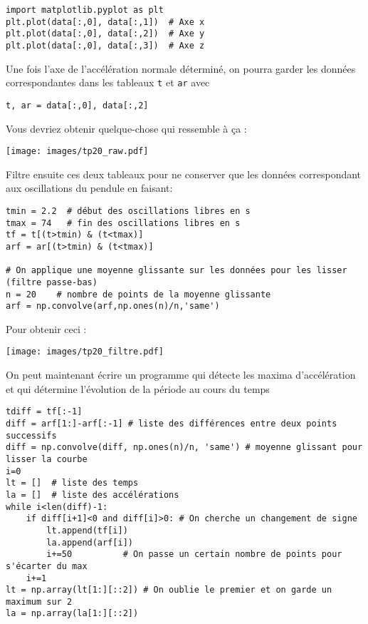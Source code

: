 \documentclass[a4paper]{tp}
\begin{document}
\begin{verbatim}
import matplotlib.pyplot as plt
plt.plot(data[:,0], data[:,1])  # Axe x
plt.plot(data[:,0], data[:,2])  # Axe y
plt.plot(data[:,0], data[:,3])  # Axe z
\end{verbatim}

Une fois l'axe de l'accélération normale déterminé, on pourra garder les données correspondantes dans les tableaux \texttt{t} et \texttt{ar} avec

\begin{verbatim}
t, ar = data[:,0], data[:,2]
\end{verbatim}

Vous devriez obtenir quelque-chose qui ressemble à ça :
\begin{center}
  \texttt{[image: images/tp20\_raw.pdf]}
\end{center}

Filtre ensuite ces deux tableaux pour ne conserver que les données correspondant aux oscillations du pendule en faisant:

\begin{verbatim}
tmin = 2.2  # début des oscillations libres en s
tmax = 74   # fin des oscillations libres en s
tf = t[(t>tmin) & (t<tmax)] 
arf = ar[(t>tmin) & (t<tmax)] 

# On applique une moyenne glissante sur les données pour les lisser (filtre passe-bas)
n = 20    # nombre de points de la moyenne glissante
arf = np.convolve(arf,np.ones(n)/n,'same')
\end{verbatim}

Pour obtenir ceci : 
\begin{center}
  \texttt{[image: images/tp20\_filtre.pdf]}
\end{center}

On peut maintenant écrire un programme qui détecte les maxima d'accélération et qui détermine l'évolution de la période au cours du temps

\begin{verbatim}
tdiff = tf[:-1]
diff = arf[1:]-arf[:-1] # liste des différences entre deux points successifs
diff = np.convolve(diff, np.ones(n)/n, 'same') # moyenne glissant pour lisser la courbe
i=0
lt = []  # liste des temps
la = []  # liste des accélérations
while i<len(diff)-1:
    if diff[i+1]<0 and diff[i]>0: # On cherche un changement de signe
        lt.append(tf[i])
        la.append(arf[i])
        i+=50          # On passe un certain nombre de points pour s'écarter du max
    i+=1
lt = np.array(lt[1:][::2]) # On oublie le premier et on garde un maximum sur 2
la = np.array(la[1:][::2])  
\end{verbatim}
\end{document}
